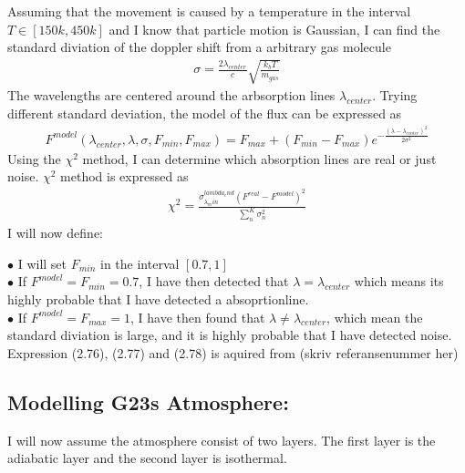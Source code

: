 \documentclass[a4paper,11pt,english]{report}
\begin{document}
Assuming that the
movement is caused by a temperature in the interval \(T \in [150k, 450k]\) and
I know that particle motion is Gaussian, I can
find the standard diviation of the doppler shift from a arbitrary gas molecule
\begin{align}
  \sigma = \frac{2\lambda_{center}}{c}\sqrt{\frac{k_{b}T }{m_{gas}}}
\end{align}
The wavelengths are centered around the arbsorption lines
\(\lambda_{center}\). Trying different  standard deviation, the
model of the flux can be expressed as
\begin{align}
  F^{model}(\lambda_{center}, \lambda,\sigma, F_{min},F_{max}) = F_{max} +
  (F_{min} - F_{max})e^{-\frac{(\lambda - \lambda_{center})^{2}}{2\sigma^{2}}}
\end{align}
Using the \(\chi^{2}\) method, I can determine
which absorption lines are real or just noise. \(\chi^{2}\) method is expressed as 
\begin{align}
  \chi^{2} = \frac{\sigma_{\lambda_min}^{lambda_end}(F^{real} -
  F^{model})^{2}}{\sum_{n}^{K}\sigma_{n}^{2}}
\end{align}
I will now define:
\begin{flushleft}
  \(\bullet\) I will set \(F_{min}\) in the interval \([0.7, 1]\)
  \\
  \(\bullet\) If \(F^{model} = F_{min} = 0.7\), I have then detected that \(\lambda =
  \lambda_{center}\) which means its highly probable that I have
  detected a absoprtionline.
  \\
  \(\bullet\) If \(F^{model} = F_{max} = 1\), I have then found that
  \(\lambda \neq \lambda_{center}\), which mean the standard diviation is
  large, and it is highly probable that I have detected noise.
  \\
  \vspace{3mm}
  Expression (2.76), (2.77) and (2.78) is aquired from (skriv referansenummer her)
\end{flushleft}
\subsection{Modelling G23s Atmosphere:}  I will now assume
the atmosphere consist of two layers. The first layer is the adiabatic layer
and the second layer is isothermal.
\end{document}
